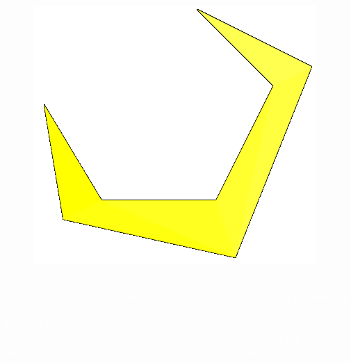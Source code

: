 \begin{definition}
\setlength{\intextsep}{0pt}%
\setlength{\columnsep}{3pt}%
\begin{figure}
\includegraphics[width=\linewidth]{src/callout/clawt2k_t.png} 
\end{figure}
\small
\textcolor{white}{
  Above, the routine  is responsible for drawing the current state of a bullet.
  Despite it's name, it's not always drawing an 'explosion'. Instead it is drawing a segment
  selected from the sprite sheet 'pic' (beasty3.cry). The routine specifies the co-ordinates and dimensions
  of the segment to pluck from 'pic' and also details the expected scaling and shearing to apply. As you 
  adjust this scale and shear over time you can achieve all sorts of interesting effects.
}
\end{definition}

\clearpage

